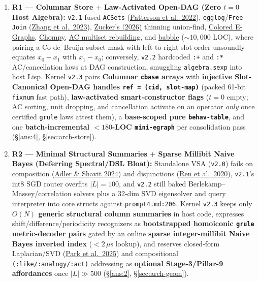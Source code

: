 \documentclass[12pt]{article}
\newcommand{\litref}[2]{\hyperlink{lit:#1}{\textcolor{citegreen}{#2}}}
\begin{document}
\begin{enumerate}[leftmargin=1.6em, itemsep=0.28em]
  \item \textbf{R1 --- Columnar Store $+$ Law-Activated Open-DAG (Zero $t=0$ Host Algebra):} \texttt{v2.1} fused \texttt{ACSets} (\litref{patterson2022}{Patterson et al.\ 2022}), \texttt{egglog}/\texttt{Free Join} (\litref{zhang2023}{Zhang et al.\ 2023}), \litref{zucker2026}{Zucker's (2026)} thinning union-find, \litref{singher2023}{Colored E-Graphs}, \litref{cheung2026}{Chompy}, \litref{rosin2026}{AC multiset rebuilding}, and \litref{cao2023}{babble} ($\sim 10,000$ LOC), where pairing a Co-de~Bruijn subset mask with left-to-right slot order unsoundly equates $x_0 - x_1$ with $x_1 - x_0$; conversely, \texttt{v2.2} hardcoded \texttt{:+} and \texttt{:*} AC/cancellation laws at DAG construction, smuggling \texttt{algebra.sexp} into host Lisp. Kernel \texttt{v2.3} pairs \textbf{Columnar \texttt{cbase} arrays} with \textbf{injective Slot-Canonical Open-DAG handles \texttt{ref = (cid, slot-map)}} (packed 61-bit \texttt{fixnum} fast path), \textbf{law-activated smart-constructor flags} ($t=0$ empty; AC sorting, unit dropping, and cancellation activate on an operator \emph{only} once certified \texttt{grule} laws attest them), a \textbf{base-scoped pure \texttt{behav-table}}, and one \textbf{batch-incremental $<180$-LOC \texttt{mini-egraph}} per consolidation pass (\S\ref{ans:4}, \S\ref{sec:arch-store}).

  \item \textbf{R2 --- Minimal Structural Summaries $+$ Sparse Millibit Naive Bayes (Deferring Spectral/DSL Bloat):} Standalone VSA (\texttt{v2.0}) fails on composition (\litref{adler2024}{Adler \& Shavit 2024}) and disjunctions (\litref{ren2020}{Ren et al.\ 2020}), \texttt{v2.1}'s int8 SGD router overfits $|L|=100$, and \texttt{v2.2} still baked Berlekamp--Massey/correlation solvers plus a 32-dim SVD eigensolver and query interpreter into core structs against \texttt{prompt4.md:206}. Kernel \texttt{v2.3} keeps only \textbf{$O(N)$ generic structural column summaries} in host code, expresses shift/difference/periodicity recognizers as \textbf{bootstrapped homoiconic \texttt{grule} metric-decoder pairs} gated by an online \textbf{sparse integer-millibit Naive Bayes inverted index} ($<2\,\mu\mathrm{s}$ lookup), and reserves closed-form Laplacian/SVD (\litref{park2025}{Park et al.\ 2025}) and compositional \texttt{(:like/:analogy/:act)} addressing as \textbf{optional Stage-3/Pillar-9 affordances} once $|L|\gg 500$ (\S\ref{ans:2}, \S\ref{sec:arch-geom}).


\end{enumerate}
\end{document}

